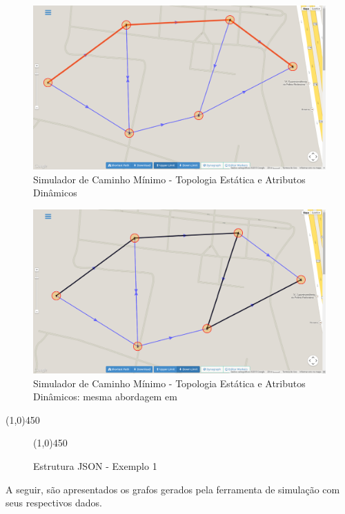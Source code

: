\begin{figure}[htbp]
\centering
 \includegraphics[width=.90\textwidth]{chapters/fig/upperlimit.png}
\caption{Simulador de Caminho Mínimo - Topologia Estática e Atributos Dinâmicos}
\label{fig:upperlimit}
\end{figure}
\FloatBarrier

\begin{figure}[htbp]
\centering
 \includegraphics[width=.90\textwidth]{chapters/fig/downlimit.png}
\caption{Simulador de Caminho Mínimo - Topologia Estática e Atributos Dinâmicos: mesma abordagem em \cite{leonard}}
\label{fig:downlimit}
\end{figure}
\FloatBarrier

\begin{center}
  \line(1,0){450}
\end{center}

\begin{figure}[htbp]
  \begin{center}
    \line(1,0){450}
  \end{center}
  \centering
  \caption{Estrutura JSON - Exemplo 1}
  \label{fig:jsondyn}
\end{figure}
\FloatBarrier

A seguir, são apresentados os grafos gerados pela ferramenta de simulação com seus respectivos dados.
